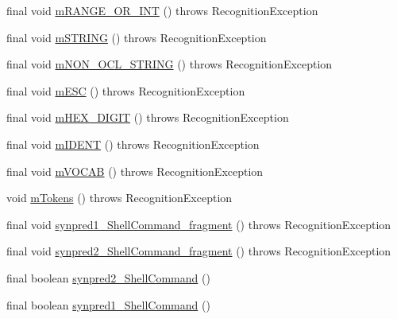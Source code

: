 \begin{DoxyCompactItemize}
\item 
final void \hyperlink{classorg_1_1tzi_1_1use_1_1parser_1_1shell_1_1_shell_command_lexer_aed17864f7f16d1a47594bc1380e92d49}{m\-R\-A\-N\-G\-E\-\_\-\-O\-R\-\_\-\-I\-N\-T} ()  throws Recognition\-Exception 
\item 
final void \hyperlink{classorg_1_1tzi_1_1use_1_1parser_1_1shell_1_1_shell_command_lexer_ab9d70385b8cf1b9508082c413183c3b4}{m\-S\-T\-R\-I\-N\-G} ()  throws Recognition\-Exception 
\item 
final void \hyperlink{classorg_1_1tzi_1_1use_1_1parser_1_1shell_1_1_shell_command_lexer_acc1d826413c1394e2008500491c314f4}{m\-N\-O\-N\-\_\-\-O\-C\-L\-\_\-\-S\-T\-R\-I\-N\-G} ()  throws Recognition\-Exception 
\item 
final void \hyperlink{classorg_1_1tzi_1_1use_1_1parser_1_1shell_1_1_shell_command_lexer_a194cae3b91c8ffefa454b35a732026e6}{m\-E\-S\-C} ()  throws Recognition\-Exception 
\item 
final void \hyperlink{classorg_1_1tzi_1_1use_1_1parser_1_1shell_1_1_shell_command_lexer_a4db0e3a38433da3d3b58356501c7b354}{m\-H\-E\-X\-\_\-\-D\-I\-G\-I\-T} ()  throws Recognition\-Exception 
\item 
final void \hyperlink{classorg_1_1tzi_1_1use_1_1parser_1_1shell_1_1_shell_command_lexer_a1c118745264c7fd8212ab43d27b26b19}{m\-I\-D\-E\-N\-T} ()  throws Recognition\-Exception 
\item 
final void \hyperlink{classorg_1_1tzi_1_1use_1_1parser_1_1shell_1_1_shell_command_lexer_a0e7a58dcd93336597b4662247b31f2be}{m\-V\-O\-C\-A\-B} ()  throws Recognition\-Exception 
\item 
void \hyperlink{classorg_1_1tzi_1_1use_1_1parser_1_1shell_1_1_shell_command_lexer_aeb54501894ee3e3674ab49b5a46c197e}{m\-Tokens} ()  throws Recognition\-Exception 
\item 
final void \hyperlink{classorg_1_1tzi_1_1use_1_1parser_1_1shell_1_1_shell_command_lexer_acbeb71a9bfa7352bcf8c508e9da8d099}{synpred1\-\_\-\-Shell\-Command\-\_\-fragment} ()  throws Recognition\-Exception 
\item 
final void \hyperlink{classorg_1_1tzi_1_1use_1_1parser_1_1shell_1_1_shell_command_lexer_a69ce43162743e93364e779bb3637e04b}{synpred2\-\_\-\-Shell\-Command\-\_\-fragment} ()  throws Recognition\-Exception 
\item 
final boolean \hyperlink{classorg_1_1tzi_1_1use_1_1parser_1_1shell_1_1_shell_command_lexer_adfb07e11477d2e8b018c5ea04433037f}{synpred2\-\_\-\-Shell\-Command} ()
\item 
final boolean \hyperlink{classorg_1_1tzi_1_1use_1_1parser_1_1shell_1_1_shell_command_lexer_a4074eedf6f603dbd012edba97f57bda1}{synpred1\-\_\-\-Shell\-Command} ()
\end{DoxyCompactItemize}
